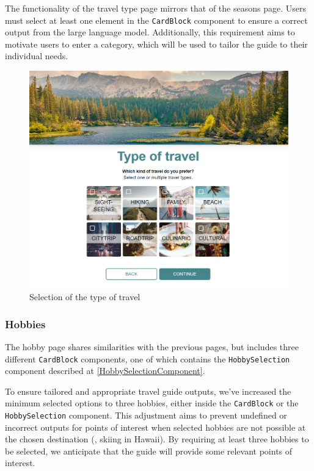 \documentclass[english,notitlepage,smartquotes]{hgbreport}
\begin{document}
The functionality of the travel type page mirrors that of the seasons page. Users must select at least one element in the \texttt{CardBlock} component to ensure a correct output from the large language model. Additionally, this requirement aims to motivate users to enter a category, which will be used to tailor the guide to their individual needs.

\begin{figure}[H]
	\centering
	\includegraphics[width=1\textwidth]{TravelType.png}
	\caption{Selection of the type of travel}
\end{figure}


\subsubsection{Hobbies}\label{Hobbies}
The hobby page shares similarities with the previous pages, but includes three different \texttt{CardBlock} components, one of which contains the \texttt{HobbySelection} component described at \ref{HobbySelectionComponent}. 

To ensure tailored and appropriate travel guide outputs, we've increased the minimum selected options to three hobbies, either inside the \texttt{CardBlock} or the \texttt{HobbySelection} component. This adjustment aims to prevent undefined or incorrect outputs for points of interest when selected hobbies are not possible at the chosen destination (\eg, skiing in Hawaii). By requiring at least three hobbies to be selected, we anticipate that the guide will provide some relevant points of interest.
\end{document}
